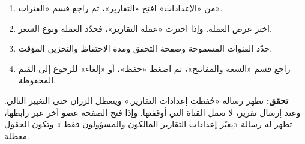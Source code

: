 \begin{enumerate}
\item من «الإعدادات» افتح «التقارير»، ثم راجع قسم «الفترات».
\item اختر عرض العملة. وإذا اخترت «عملة التقارير»، فحدّد العملة ونوع السعر.
\item حدّد القنوات المسموحة وصفحة التحقق ومدة الاحتفاظ والتخزين المؤقت.
\item راجع قسم «السعة والمفاتيح»، ثم اضغط «حفظ»، أو «إلغاء» للرجوع إلى القيم المحفوظة.
\end{enumerate}

\textbf{تحقق:} تظهر رسالة «حُفظت إعدادات التقارير.» ويتعطل الزران حتى التغيير التالي. وعند إرسال تقرير، لا تعمل القناة التي أوقفتها. وإذا فتح الصفحة عضو آخر عبر رابطها، تظهر له رسالة «يغيّر إعدادات التقارير المالكون والمسؤولون فقط.» وتكون الحقول معطلة.
